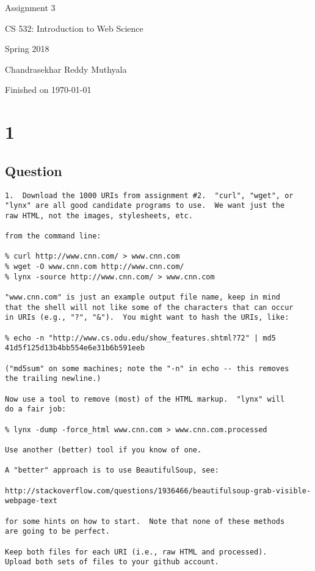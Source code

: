\documentclass[letterpaper,11pt]{article}
\begin{document}
\begin{titlepage}

\begin{center}

\Huge{Assignment 3}

\Large{CS 532:  Introduction to Web Science}

\Large{Spring 2018}

\Large{Chandrasekhar Reddy Muthyala}

\Large Finished on \today

\end{center}

\end{titlepage}

\newpage


\section*{1}


\subsection*{Question}

\begin{verbatim}
1.  Download the 1000 URIs from assignment #2.  "curl", "wget", or
"lynx" are all good candidate programs to use.  We want just the
raw HTML, not the images, stylesheets, etc.

from the command line:

% curl http://www.cnn.com/ > www.cnn.com
% wget -O www.cnn.com http://www.cnn.com/
% lynx -source http://www.cnn.com/ > www.cnn.com

"www.cnn.com" is just an example output file name, keep in mind
that the shell will not like some of the characters that can occur
in URIs (e.g., "?", "&").  You might want to hash the URIs, like:

% echo -n "http://www.cs.odu.edu/show_features.shtml?72" | md5
41d5f125d13b4bb554e6e31b6b591eeb

("md5sum" on some machines; note the "-n" in echo -- this removes
the trailing newline.) 

Now use a tool to remove (most) of the HTML markup.  "lynx" will
do a fair job:

% lynx -dump -force_html www.cnn.com > www.cnn.com.processed

Use another (better) tool if you know of one.  

A "better" approach is to use BeautifulSoup, see:

http://stackoverflow.com/questions/1936466/beautifulsoup-grab-visible-webpage-text

for some hints on how to start.  Note that none of these methods 
are going to be perfect.

Keep both files for each URI (i.e., raw HTML and processed). 
Upload both sets of files to your github account.
\end{verbatim}
\end{document}
